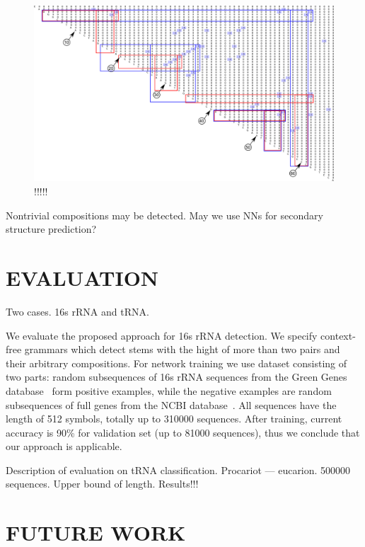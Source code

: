 \documentclass[a4paper,twoside]{article}
\begin{document}
\begin{figure}
\centering
\includegraphics[width=.98\textwidth]{figures/0m.pdf}
\caption{!!!!!}
\label{fig:!!!}
\end{figure}

Nontrivial compositions may be detected.
May we use NNs for secondary structure prediction?


\section{\uppercase{Evaluation}}
\label{sec:evaluation}

Two cases. 
16s rRNA and tRNA.

\noindent We evaluate the proposed approach for 16s rRNA detection.
We specify context-free grammars which detect stems with the hight of more than two pairs and their arbitrary compositions.
For network training we use dataset consisting of two parts: random subsequences of 16s rRNA sequences from the Green Genes database~\cite{pmid16820507} form positive examples, while the negative examples are random subsequences of full genes from the NCBI database~\cite{pmid19854944}.
All sequences have the length of 512 symbols, totally up to 310000 sequences.
After training, current accuracy is 90\% for validation set (up to 81000 sequences), thus we conclude that our approach is applicable.

Description of evaluation on tRNA classification.
Procariot --- eucarion.
500000 sequences.
Upper bound of length.
Results!!!

\section{\uppercase{Future Work}}
\label{sec:FutureWork}
\end{document}
